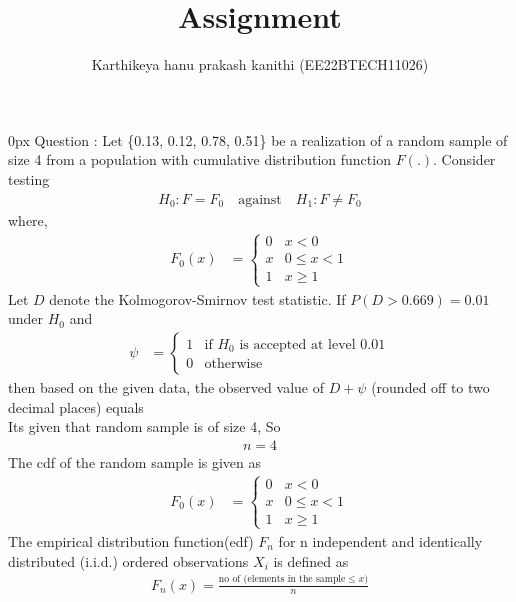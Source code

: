 \documentclass[article]{IEEEtran}
\theoremstyle{remark}
\begin{document}
\let\vec\mathbf


\title{
Assignment
}
\author{ Karthikeya hanu prakash kanithi (EE22BTECH11026)}
\maketitle
\parindent0px
\vspace{3cm}
Question : Let \{0.13, 0.12, 0.78, 0.51\} be a realization of a random sample of size 4 from a population with cumulative distribution function $F(.)$. Consider testing
\begin{align}
H_0 : F = F_0 \quad \text{against} \quad H_1 : F \ne F_0
\end{align}
where,
\begin{align}
    F_0(x) &= 
    \begin{cases}
        0 &  x<0  \\
        x & 0\le x<1 \\
        1 & x\ge 1
    \end{cases}
\end{align}
Let $D$ denote the Kolmogorov-Smirnov test statistic. If $P (D > 0.669) = 0.01$ under $H_0$ and
\begin{align}
    \psi &= 
    \begin{cases}
        1 &  \text{if } H_0 \text{ is accepted at level } 0.01 \\
        0 &  \text{otherwise} 
    \end{cases} 
\end{align}
then based on the given data, the observed value of $D + \psi$ (rounded off to two decimal places) equals
\\\solution 
Its given that random sample is of size 4, So 
\begin{align}
	n=4 \label{eq:st/65/1}
\end{align}
The cdf of the random sample is given as 
\begin{align}
    F_0(x) &= 
    \begin{cases}
        0 &  x<0  \\
        x & 0\le x<1 \\
        1 & x\ge 1
    \end{cases} \label{eq:st/65/2}
\end{align}
The empirical distribution function(edf) $F_n$ for n independent and identically distributed (i.i.d.) ordered observations $X_i$ is defined as
\begin{align}
	F_n(x) = \frac{\text{no of (elements in the sample} \le x)}{n} \label{eq:st/65/3}
\end{align}
\end{document}

